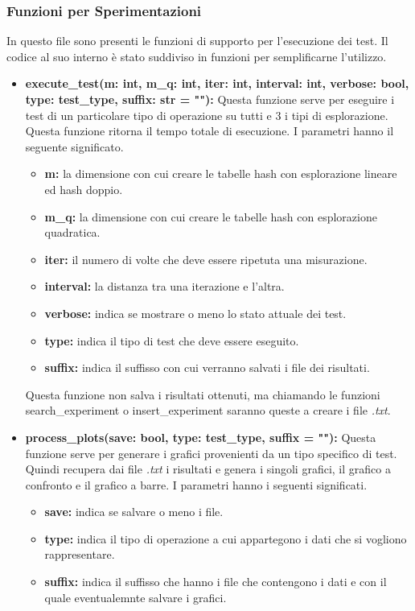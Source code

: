 \documentclass{article}
\newcommand{\newlineitem}[1]{\item \textbf{#1} \hfill \break}
\begin{document}
\subsubsection{Funzioni per Sperimentazioni}
In questo file sono presenti le funzioni di supporto per l'esecuzione dei test. Il codice al suo interno è stato suddiviso in funzioni per semplificarne l'utilizzo.
\begin{itemize}
\newlineitem{execute\_test(m: int, m\_q: int, iter: int, interval: int, verbose: bool, type: test\_type, suffix: str = ""):}
Questa funzione serve per eseguire i test di un particolare tipo di operazione su tutti e 3 i tipi di esplorazione. Questa funzione ritorna il tempo totale di esecuzione. I parametri hanno il seguente significato.
\begin{itemize}
\item \textbf{m:} la dimensione con cui creare le tabelle hash con esplorazione lineare ed hash doppio.
\item \textbf{m\_q:} la dimensione con cui creare le tabelle hash con esplorazione quadratica.
\item \textbf{iter:} il numero di volte che deve essere ripetuta una misurazione.
\item \textbf{interval:} la distanza tra una iterazione e l'altra.
\item \textbf{verbose:} indica se mostrare o meno lo stato attuale dei test.
\item \textbf{type:} indica il tipo di test che deve essere eseguito.
\item \textbf{suffix:} indica il suffisso con cui verranno salvati i file dei risultati.
\end{itemize}
Questa funzione non salva i risultati ottenuti, ma chiamando le funzioni search\_experiment o insert\_experiment saranno queste a creare i file \emph{.txt}.
\newlineitem{process\_plots(save: bool, type: test\_type, suffix = ""):}
Questa funzione serve per generare i grafici provenienti da un tipo specifico di test. Quindi recupera dai file \emph{.txt} i risultati e genera i singoli grafici, il grafico a confronto e il grafico a barre. I parametri hanno i seguenti significati.
\begin{itemize}
\item \textbf{save:} indica se salvare o meno i file.
\item \textbf{type:} indica il tipo di operazione a cui appartegono i dati che si vogliono rappresentare.
\item \textbf{suffix:} indica il suffisso che hanno i file che contengono i dati e con il quale eventualemnte salvare i grafici.
\end{itemize} 


\end{itemize}
\end{document}
